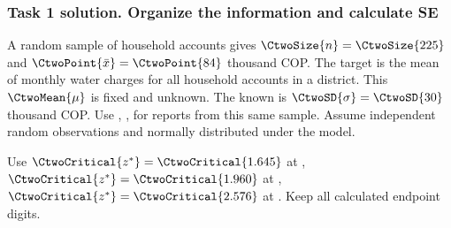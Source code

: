 \subsubsection*{Task 1 solution. Organize the information and calculate SE}
\label{sol:c2-advanced-d-a}
A random sample of  household accounts gives $\CtwoSize{n}=\CtwoSize{225}$ and  $\CtwoPoint{\bar{x}}=\CtwoPoint{84}$ thousand COP. The target is the mean of monthly water charges for all household accounts in a district. This  $\CtwoMean{\mu}$ is fixed and unknown. The known  is $\CtwoSD{\sigma}=\CtwoSD{30}$ thousand COP. Use , ,   for reports from this same sample. Assume independent random observations and normally distributed  under the model.

Use $\CtwoCritical{z^*}=\CtwoCritical{1.645}$ at , $\CtwoCritical{z^*}=\CtwoCritical{1.960}$ at , $\CtwoCritical{z^*}=\CtwoCritical{2.576}$ at . Keep all calculated endpoint digits.


